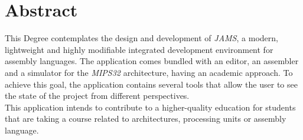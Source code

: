 \chapter{Abstract} \label{ch:abstract}

This Degree contemplates the design and development of \textit{JAMS},
a modern, lightweight and highly modifiable integrated
development environment for assembly languages.
The application comes bundled with an editor, an assembler and
a simulator for the \textit{MIPS32} architecture, having
an academic approach.
To achieve this goal, the application contains several tools that
allow the user to see the state of the project from different
perspectives. \\
This application intends to contribute to a higher-quality education
for students that are taking a course related to architectures,
processing units or assembly language.